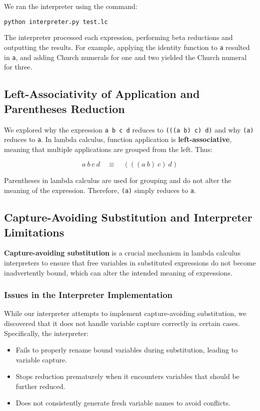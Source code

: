 \documentclass{article}
\begin{document}
We ran the interpreter using the command:

\begin{lstlisting}[language=bash]
python interpreter.py test.lc
\end{lstlisting}

The interpreter processed each expression, performing beta reductions and outputting the results. For example, applying the identity function to \texttt{a} resulted in \texttt{a}, and adding Church numerals for one and two yielded the Church numeral for three.

\subsection*{Left-Associativity of Application and Parentheses Reduction}

We explored why the expression \texttt{a b c d} reduces to \texttt{(((a b) c) d)} and why \texttt{(a)} reduces to \texttt{a}. In lambda calculus, function application is \textbf{left-associative}, meaning that multiple applications are grouped from the left. Thus:

\[
a\ b\ c\ d \quad \equiv \quad (((a\ b)\ c)\ d)
\]

Parentheses in lambda calculus are used for grouping and do not alter the meaning of the expression. Therefore, \texttt{(a)} simply reduces to \texttt{a}.

\subsection*{Capture-Avoiding Substitution and Interpreter Limitations}

\textbf{Capture-avoiding substitution} is a crucial mechanism in lambda calculus interpreters to ensure that free variables in substituted expressions do not become inadvertently bound, which can alter the intended meaning of expressions.

\subsubsection*{Issues in the Interpreter Implementation}

While our interpreter attempts to implement capture-avoiding substitution, we discovered that it does not handle variable capture correctly in certain cases. Specifically, the interpreter:

\begin{itemize}
    \item Fails to properly rename bound variables during substitution, leading to variable capture.
    \item Stops reduction prematurely when it encounters variables that should be further reduced.
    \item Does not consistently generate fresh variable names to avoid conflicts.
\end{itemize}
\end{document}
